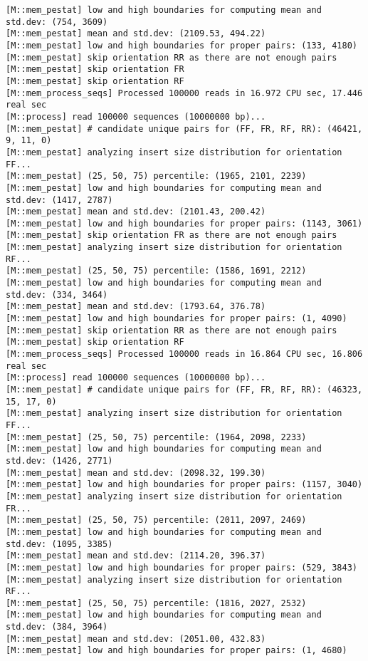 \begin{lstlisting}
[M::mem_pestat] low and high boundaries for computing mean and std.dev: (754, 3609)
[M::mem_pestat] mean and std.dev: (2109.53, 494.22)
[M::mem_pestat] low and high boundaries for proper pairs: (133, 4180)
[M::mem_pestat] skip orientation RR as there are not enough pairs
[M::mem_pestat] skip orientation FR
[M::mem_pestat] skip orientation RF
[M::mem_process_seqs] Processed 100000 reads in 16.972 CPU sec, 17.446 real sec
[M::process] read 100000 sequences (10000000 bp)...
[M::mem_pestat] # candidate unique pairs for (FF, FR, RF, RR): (46421, 9, 11, 0)
[M::mem_pestat] analyzing insert size distribution for orientation FF...
[M::mem_pestat] (25, 50, 75) percentile: (1965, 2101, 2239)
[M::mem_pestat] low and high boundaries for computing mean and std.dev: (1417, 2787)
[M::mem_pestat] mean and std.dev: (2101.43, 200.42)
[M::mem_pestat] low and high boundaries for proper pairs: (1143, 3061)
[M::mem_pestat] skip orientation FR as there are not enough pairs
[M::mem_pestat] analyzing insert size distribution for orientation RF...
[M::mem_pestat] (25, 50, 75) percentile: (1586, 1691, 2212)
[M::mem_pestat] low and high boundaries for computing mean and std.dev: (334, 3464)
[M::mem_pestat] mean and std.dev: (1793.64, 376.78)
[M::mem_pestat] low and high boundaries for proper pairs: (1, 4090)
[M::mem_pestat] skip orientation RR as there are not enough pairs
[M::mem_pestat] skip orientation RF
[M::mem_process_seqs] Processed 100000 reads in 16.864 CPU sec, 16.806 real sec
[M::process] read 100000 sequences (10000000 bp)...
[M::mem_pestat] # candidate unique pairs for (FF, FR, RF, RR): (46323, 15, 17, 0)
[M::mem_pestat] analyzing insert size distribution for orientation FF...
[M::mem_pestat] (25, 50, 75) percentile: (1964, 2098, 2233)
[M::mem_pestat] low and high boundaries for computing mean and std.dev: (1426, 2771)
[M::mem_pestat] mean and std.dev: (2098.32, 199.30)
[M::mem_pestat] low and high boundaries for proper pairs: (1157, 3040)
[M::mem_pestat] analyzing insert size distribution for orientation FR...
[M::mem_pestat] (25, 50, 75) percentile: (2011, 2097, 2469)
[M::mem_pestat] low and high boundaries for computing mean and std.dev: (1095, 3385)
[M::mem_pestat] mean and std.dev: (2114.20, 396.37)
[M::mem_pestat] low and high boundaries for proper pairs: (529, 3843)
[M::mem_pestat] analyzing insert size distribution for orientation RF...
[M::mem_pestat] (25, 50, 75) percentile: (1816, 2027, 2532)
[M::mem_pestat] low and high boundaries for computing mean and std.dev: (384, 3964)
[M::mem_pestat] mean and std.dev: (2051.00, 432.83)
[M::mem_pestat] low and high boundaries for proper pairs: (1, 4680)

\end{lstlisting}
